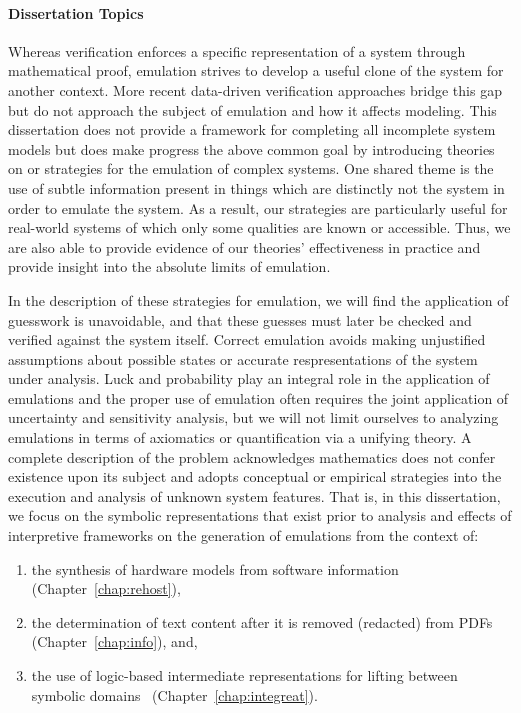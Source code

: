 \paragraph{Dissertation Topics}
Whereas verification enforces a specific representation of a system through mathematical proof, emulation strives to develop a useful clone of the system for another context.
More recent data-driven verification approaches bridge this gap but do not approach the subject of emulation and how it affects modeling.
This dissertation does not provide a framework for completing all incomplete system models but does make progress the above common goal by introducing theories on or strategies for the emulation of complex systems.
One shared theme is the use of subtle information present in things which are distinctly not the system in order to emulate the system.
As a result, our strategies are particularly useful for real-world systems of which only some qualities are known or accessible.
Thus, we are also able to provide evidence of our theories' effectiveness in practice and provide insight into the absolute limits of emulation.

In the description of these strategies for emulation, we will find the application of guesswork is unavoidable, and that these guesses must later be checked and verified against the system itself.
Correct emulation avoids making unjustified assumptions about possible states or accurate respresentations of the system under analysis.
Luck and probability play an integral role in the application of emulations and the proper use of emulation often requires the joint application of uncertainty and sensitivity analysis, but we will not limit ourselves to analyzing emulations in terms of axiomatics or quantification via a unifying theory.
A complete description of the problem acknowledges mathematics does not confer existence upon its subject and adopts conceptual or empirical strategies into the execution and analysis of unknown system features.
That is, in this dissertation, we focus on the symbolic representations that exist prior to analysis and effects of interpretive frameworks on the generation of emulations from the context of:

\begin{enumerate}
	\item the synthesis of hardware models from software information~\cite{johnson2021jetset} (Chapter~\ref{chap:rehost}),
	\item the determination of text content after it is removed (redacted) from PDFs~\cite{bland2023story} (Chapter~\ref{chap:info}), and,
	\item the use of logic-based intermediate representations for lifting between symbolic domains~\cite{bland2023integreat} (Chapter~\ref{chap:integreat}).
\end{enumerate}

